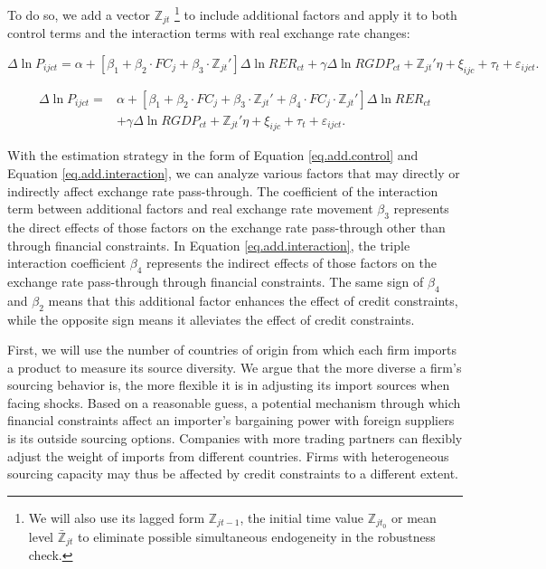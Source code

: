 To do so, we add a vector $\mathbb{Z}_{jt}$ \footnote{We will also use its lagged form $\mathbb{Z}_{jt-1}$, the initial time value $\mathbb{Z}_{jt_0}$ or mean level $\bar{\mathbb{Z}}_{jt}$ to eliminate possible simultaneous endogeneity in the robustness check.} to include additional factors and apply it to both control terms and the interaction terms with real exchange rate changes: 

\begin{equation}
	\Delta \ln P_{ijct}=\alpha+[\beta_{1}+ \beta_{2} \cdot FC_{j}+\beta_{3} \cdot {\mathbb{Z}_{jt}}'] \Delta \ln RER_{ct} +\gamma \Delta \ln RGDP_{ct}+ {\mathbb{Z}_{jt}}' \eta+\xi_{ijc}+\tau_{t} +\varepsilon_{ijct}.
	\label{eq.add.control}
\end{equation}

\begin{equation}
	\begin{aligned}
	\Delta \ln P_{ijct}=&\alpha+[\beta_{1}+ \beta_{2} \cdot FC_{j}+\beta_{3} \cdot {\mathbb{Z}_{jt}}'+\beta_{4} \cdot FC_{j} \cdot {\mathbb{Z}_{jt}}'] \Delta \ln RER_{ct} \\ &+\gamma \Delta \ln RGDP_{ct}+ {\mathbb{Z}_{jt}}' \eta+\xi_{ijc}+\tau_{t} +\varepsilon_{ijct}.
	\end{aligned}	
	\label{eq.add.interaction}
\end{equation}

With the estimation strategy in the form of Equation \ref{eq.add.control} and Equation \ref{eq.add.interaction}, we can analyze various factors that may directly or indirectly affect exchange rate pass-through. The coefficient of the interaction term between additional factors and real exchange rate movement $\beta_3$ represents the direct effects of those factors on the exchange rate pass-through other than through financial constraints. In Equation \ref{eq.add.interaction}, the triple interaction coefficient $\beta_4$ represents the indirect effects of those factors on the exchange rate pass-through through financial constraints. The same sign of $\beta_4$ and $\beta_2$ means that this additional factor enhances the effect of credit constraints, while the opposite sign means it alleviates the effect of credit constraints. 

First, we will use the number of countries of origin from which each firm imports a product to measure its source diversity. We argue that the more diverse a firm's sourcing behavior is, the more flexible it is in adjusting its import sources when facing shocks. Based on a reasonable guess, a potential mechanism through which financial constraints affect an importer's bargaining power with foreign suppliers is its outside sourcing options. Companies with more trading partners can flexibly adjust the weight of imports from different countries. Firms with heterogeneous sourcing capacity may thus be affected by credit constraints to a different extent. 

